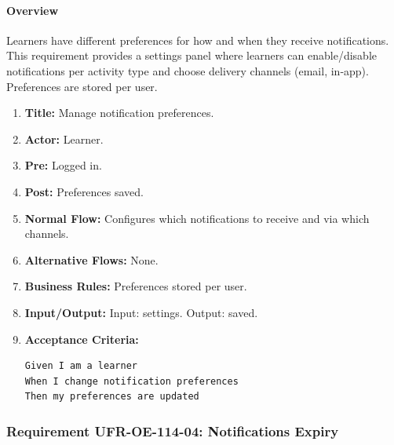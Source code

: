 \paragraph{Overview}
Learners have different preferences for how and when they receive notifications. This requirement provides a settings panel where learners can enable/disable notifications per activity type and choose delivery channels (email, in‑app). Preferences are stored per user.
\begin{enumerate}[label=\textbf{\arabic*.}]
\item \textbf{Title:} Manage notification preferences.
\item \textbf{Actor:} Learner.
\item \textbf{Pre:} Logged in.
\item \textbf{Post:} Preferences saved.
\item \textbf{Normal Flow:} Configures which notifications to receive and via which channels.
\item \textbf{Alternative Flows:} None.
\item \textbf{Business Rules:} Preferences stored per user.
\item \textbf{Input/Output:} Input: settings. Output: saved.
\item \textbf{Acceptance Criteria:}
    \begin{verbatim}
Given I am a learner
When I change notification preferences
Then my preferences are updated
    \end{verbatim}
\end{enumerate}

\subsubsection{Requirement UFR-OE-114-04: Notifications Expiry}

